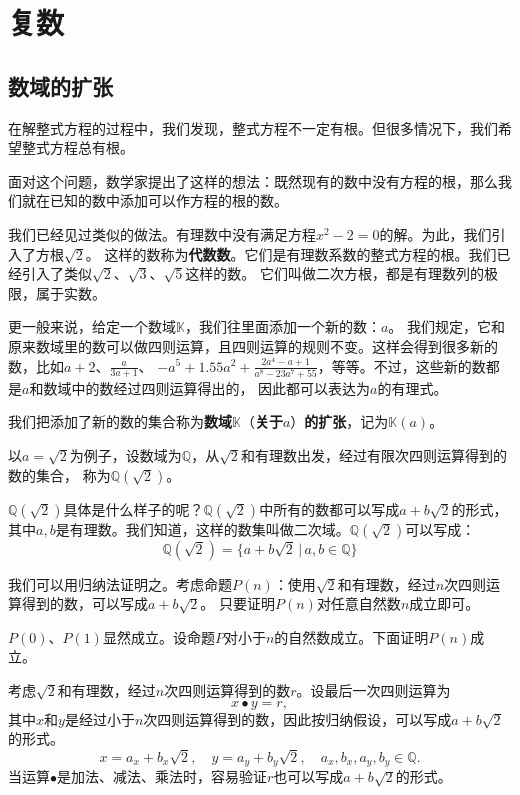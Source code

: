 \documentclass[12pt,UTF8,fontset=none]{ctexbook}
\begin{document}
\chapter{复数}

\section{数域的扩张}

在解整式方程的过程中，我们发现，整式方程不一定有根。但很多情况下，我们希望整式方程总有根。

面对这个问题，数学家提出了这样的想法：既然现有的数中没有方程的根，那么我们就在已知的数中添加可以作方程的根的数。

我们已经见过类似的做法。有理数中没有满足方程$x^2 - 2 = 0$的解。为此，我们引入了方根$\sqrt{2}$。
这样的数称为\textbf{代数数}。它们是有理数系数的整式方程的根。我们已经引入了类似$\sqrt{2}$、$\sqrt{3}$、$\sqrt{5}$这样的数。
它们叫做二次方根，都是有理数列的极限，属于实数。

更一般来说，给定一个数域$\mathbb{K}$，我们往里面添加一个新的数：$a$。
我们规定，它和原来数域里的数可以做四则运算，且四则运算的规则不变。这样会得到很多新的数，比如$a+2$、$\frac{a}{3a+1}$、
$- a^5 + 1.55a^2 + \frac{2a^4 - a + 1}{a^8 - 23a^7 + 55}$，等等。不过，这些新的数都是$a$和数域中的数经过四则运算得出的，
因此都可以表达为$a$的有理式。

我们把添加了新的数的集合称为\textbf{数域}$\mathbb{K}$（\textbf{关于}$a$）\textbf{的扩张}，记为$\mathbb{K}(a)$。

以$a = \sqrt{2}$为例子，设数域为$\mathbb{Q}$，从$\sqrt{2}$和有理数出发，经过有限次四则运算得到的数的集合，
称为$\mathbb{Q}(\sqrt{2})$。

$\mathbb{Q}(\sqrt{2})$具体是什么样子的呢？$\mathbb{Q}(\sqrt{2})$中所有的数都可以写成$a + b\sqrt{2}$的形式，
其中$a,b$是有理数。我们知道，这样的数集叫做二次域。$\mathbb{Q}(\sqrt{2})$可以写成：
$$ \mathbb{Q}(\sqrt{2}) = \{a + b\sqrt{2} \, | \, a, b \in\mathbb{Q}\}$$

我们可以用归纳法证明之。考虑命题$P(n)$：使用$\sqrt{2}$和有理数，经过$n$次四则运算得到的数，可以写成$a + b\sqrt{2}$。
只要证明$P(n)$对任意自然数$n$成立即可。

$P(0)$、$P(1)$显然成立。设命题$P$对小于$n$的自然数成立。下面证明$P(n)$成立。

考虑$\sqrt{2}$和有理数，经过$n$次四则运算得到的数$r$。设最后一次四则运算为
$$ x \bullet y = r,$$
其中$x$和$y$是经过小于$n$次四则运算得到的数，因此按归纳假设，可以写成$a + b\sqrt{2}$的形式。
$$ x = a_x + b_x\sqrt{2}, \quad y = a_y + b_y\sqrt{2}, \quad a_x, b_x, a_y, b_y \in \mathbb{Q}.$$
当运算$\bullet$是加法、减法、乘法时，容易验证$r$也可以写成$a + b\sqrt{2}$的形式。
\end{document}
